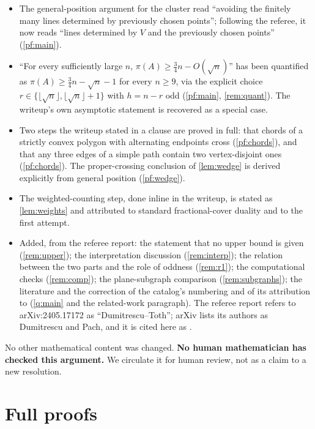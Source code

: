 \documentclass[11pt,a4paper]{article}
\theoremstyle{plain}
\theoremstyle{definition}
\theoremstyle{remark}
\providecommand{\tightlist}{\setlength{\itemsep}{0pt}\setlength{\parskip}{0pt}}
\newcommand{\pipath}{\pi}
\begin{document}
\begin{itemize}[leftmargin=1.6em]\tightlist
\item The general-position argument for the cluster read ``avoiding the finitely many lines determined by previously chosen points''; following the referee, it now reads ``lines determined by $V$ and the previously chosen points'' (\cref{pf:main}).
\item ``For every sufficiently large $n$, $\pipath(A)\ge\tfrac34n-O(\sqrt n)$'' has been quantified as $\pipath(A)\ge\tfrac34n-\sqrt n-1$ for every $n\ge9$, via the explicit choice $r\in\{\lfloor\sqrt n\rfloor,\lfloor\sqrt n\rfloor+1\}$ with $h=n-r$ odd (\cref{pf:main}, \cref{rem:quant}). The writeup's own asymptotic statement is recovered as a special case.
\item Two steps the writeup stated in a clause are proved in full: that chords of a strictly convex polygon with alternating endpoints cross (\cref{pf:chords}), and that any three edges of a simple path contain two vertex-disjoint ones (\cref{pf:chords}). The proper-crossing conclusion of \cref{lem:wedge} is derived explicitly from general position (\cref{pf:wedge}).
\item The weighted-counting step, done inline in the writeup, is stated as \cref{lem:weights} and attributed to standard fractional-cover duality and to the first attempt.
\item Added, from the referee report: the statement that no upper bound is given (\cref{rem:upper}); the interpretation discussion (\cref{rem:interp}); the relation between the two parts and the role of oddness (\cref{rem:r1}); the computational checks (\cref{rem:comp}); the plane-subgraph comparison (\cref{rem:subgraphs}); the literature \cite{BK79,OO21,AOO22,DP24,PSS23,AAB25} and the correction of the catalog's numbering and of its attribution to \cite{PSS23} (\cref{q:main} and the related-work paragraph). The referee report refers to arXiv:2405.17172 as ``Dumitrescu--Toth''; arXiv lists its authors as Dumitrescu and Pach, and it is cited here as \cite{DP24}.
\end{itemize}
No other mathematical content was changed.
\textbf{No human mathematician has checked this argument.} We circulate it for human review, not as a claim to a new resolution.

\appendix

\section{Full proofs}\label{app:proofs}
\end{document}
